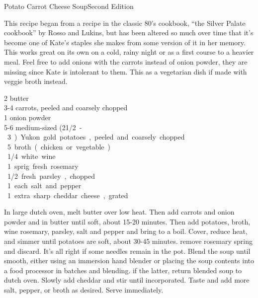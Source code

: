 \begin{entry}{Potato Carrot Cheese Soup}{Second Edition}

\begin{open}
  This recipe began from a recipe in the classic 80's cookbook, ``the Silver
  Palate cookbook'' by Rosso and Lukins, but has been altered so much over
  time that it's become one of Kate's staples she makes from some version of
  it in her memory. This works great on its own on a cold, rainy night or as a
  first course to a heavier meal. Feel free to add onions with the carrots
  instead of onion powder, they are missing since Kate is intolerant to them. This as a vegetarian dish if made with veggie broth instead.
\end{open}
\begin{ingredients}
    \SI{2}{\tblspoon} butter\\
    3-4 carrots, peeled and coarsely chopped\\
    \SI{1}{\teaspoon} onion powder\\
    5-6 medium-sized (2\SI{1/2}-\SI{3}{\pound}) Yukon gold potatoes, peeled and
    coarsely chopped \\
    \SI{5}{\cup} broth (chicken or vegetable)\\
    \SI{1/4}{\cup} white wine \\
    1 sprig fresh rosemary \\
    \SI{1/2}{\cup} fresh parsley, chopped\\
    \SI{1}{\teaspoon} each salt and pepper\\
    \SI{1}{\cup} extra sharp cheddar cheese, grated
\end{ingredients}
In large dutch oven, melt butter over low heat. Then add carrots and onion
powder and \saute in butter until soft, about 15-20 minutes. Then add potatoes,
broth, wine rosemary, parsley, salt and pepper and bring to a boil. Cover,
reduce heat, and simmer until potatoes are soft, about 30-45 minutes. remove
rosemary spring and discard. It's all right if some needles remain in the
pot. Blend the soup until smooth, either using an immersion hand blender or
placing the soup contents into a food processor in batches and blending. if
the latter, return blended soup to dutch oven. Slowly add cheddar and stir
until incorporated. Taste and add more salt, pepper, or broth as
desired. Serve immediately.
\end{entry}

